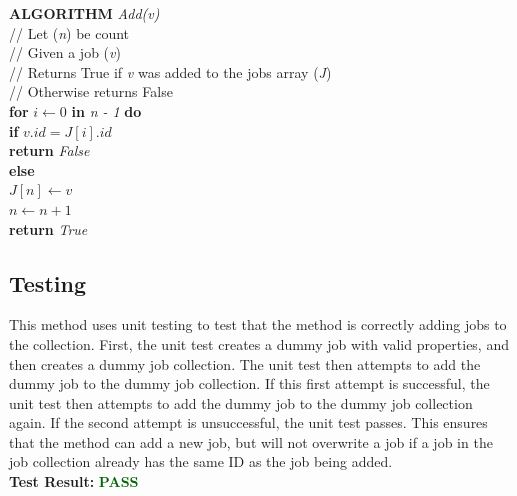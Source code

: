 \documentclass[12pt,a4paper]{article}
\begin{document}
			\textbf{ALGORITHM} \textit{Add(v)}\\
			\null\hspace{1cm}// Let (\textit{n}) be count\\
			\null\hspace{1cm}// Given a job (\textit{v})\\
			\null\hspace{1cm}// Returns True if \textit{v} was added to the jobs array (\textit{J})\\
			\null\hspace{1cm}// Otherwise returns False\\
			\null\hspace{1cm}\textbf{for} \textit{$i \gets 0$} \textbf{in} \textit{n - 1} \textbf{do}\\
			\null\hspace{2cm}\textbf{if} \textit{$v.id = J[i].id$}\\
			\null\hspace{3cm}\textbf{return} \textit{False}\\
			\null\hspace{1cm}\textbf{else}\\
			\null\hspace{2cm}\textit{$J[n] \gets v$}\\
			\null\hspace{2cm}\textit{$n \gets n + 1$}\\
			\null\hspace{2cm}\textbf{return} \textit{True}\\

		\subsection{Testing}
			This method uses unit testing to test that the method is correctly adding jobs to the 
			collection. First, the unit test creates a dummy job with valid properties, and then creates 
			a dummy job collection. The unit test then attempts to add the dummy job to the dummy job 
			collection. If this first attempt is successful, the unit test then attempts to add the dummy 
			job to the dummy job collection again. If the second attempt is unsuccessful, the unit test 
			passes. This ensures that the method can add a new job, but will not overwrite a job if a job in 
			the job collection already has the same ID as the job being added.\\

			\textbf{Test Result:} \textbf{\textcolor{darkgreen}{PASS}}\\
\end{document}
